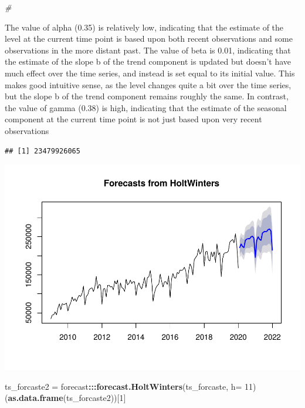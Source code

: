 \documentclass[
]{article}
\newenvironment{Shaded}{\begin{snugshade}}{\end{snugshade}}
\newcommand{\CommentTok}[1]{\textcolor[rgb]{0.56,0.35,0.01}{\textit{#1}}}
\newcommand{\DataTypeTok}[1]{\textcolor[rgb]{0.13,0.29,0.53}{#1}}
\newcommand{\DecValTok}[1]{\textcolor[rgb]{0.00,0.00,0.81}{#1}}
\newcommand{\KeywordTok}[1]{\textcolor[rgb]{0.13,0.29,0.53}{\textbf{#1}}}
\newcommand{\NormalTok}[1]{#1}
\newcommand{\OperatorTok}[1]{\textcolor[rgb]{0.81,0.36,0.00}{\textbf{#1}}}
\newcommand{\StringTok}[1]{\textcolor[rgb]{0.31,0.60,0.02}{#1}}
\begin{document}
\begin{Shaded}
\begin{Highlighting}[]
\CommentTok{#}
\end{Highlighting}
\end{Shaded}

The value of alpha (0.35) is relatively low, indicating that the
estimate of the level at the current time point is based upon both
recent observations and some observations in the more distant past. The
value of beta is 0.01, indicating that the estimate of the slope b of
the trend component is updated but doesn't have much effect over the
time series, and instead is set equal to its initial value. This makes
good intuitive sense, as the level changes quite a bit over the time
series, but the slope b of the trend component remains roughly the same.
In contrast, the value of gamma (0.38) is high, indicating that the
estimate of the seasonal component at the current time point is not just
based upon very recent observations

\begin{Shaded}
\end{Shaded}

\begin{verbatim}
## [1] 23479926065
\end{verbatim}

\includegraphics{tsf_export_files/figure-latex/unnamed-chunk-13-1.pdf}

\begin{Shaded}
\begin{Highlighting}[]
\NormalTok{ts_forcaste2 =}\StringTok{ }\NormalTok{forecast}\OperatorTok{:::}\KeywordTok{forecast.HoltWinters}\NormalTok{(ts_forcaste, }\DataTypeTok{h=} \DecValTok{11}\NormalTok{)}
\NormalTok{(}\KeywordTok{as.data.frame}\NormalTok{(ts_forcaste2))[}\DecValTok{1}\NormalTok{]}
\end{Highlighting}
\end{Shaded}
\end{document}
